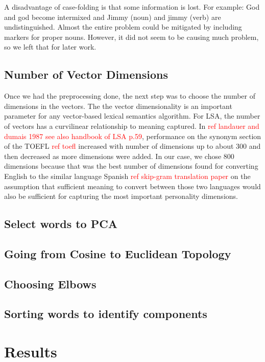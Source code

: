 \documentclass[10pt,letterpaper]{book}
\newcommand{\todo}[1]{\textcolor{red}{#1}}
\begin{document}
A disadvantage of case-folding is that some information is lost. For example: God and god become intermixed and Jimmy (noun) and jimmy (verb) are undistinguished. Almost the entire problem could be mitigated by including markers for proper nouns. However, it did not seem to be causing much problem, so we left that for later work.

\section{Number of Vector Dimensions}

Once we had the preprocessing done, the next step was to choose the number of dimensions in the vectors. The the vector dimensionality is an important parameter for any vector-based lexical semantics algorithm. For LSA, the number of vectors has a curvilinear relationship to meaning captured. In \todo{ref landauer and dumais 1987 see also handbook of LSA p.59}, performance on the synonym section of the TOEFL \todo{ref toefl} increased with number of dimensions up to about 300 and then decreased as more dimensions were added. In our case, we chose 800 dimensions because that was the best number of dimensions found for converting English to the similar language Spanish \todo{ref skip-gram translation paper} on the assumption that sufficient meaning to convert between those two languages would also be sufficient for capturing the most important personality dimensions.

\section{Select words to PCA}

\section{Going from Cosine to Euclidean Topology}

\section{Choosing Elbows}

\section{Sorting words to identify components}

\chapter{Results}
\end{document}
